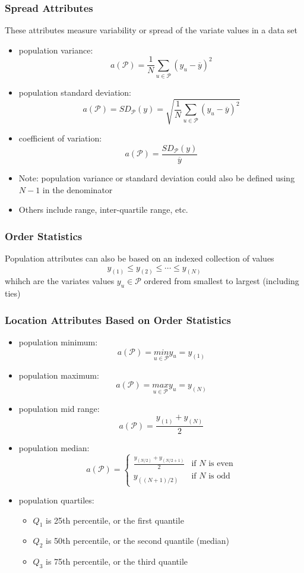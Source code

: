 \documentclass[11pt]{article}
\begin{document}
\subsubsection*{Spread Attributes}
These attributes measure variability or spread of the variate values in a data set
\begin{itemize}
    \item population variance: \[a(\mathcal{P})=\frac{1}{N}\sum_{u\in\mathcal{P}}(y_u-\overline{y})^2\]
    \item population standard deviation: \[a(\mathcal{P})=SD_\mathcal{P}(y)=\sqrt{\frac{1}{N}\sum_{u\in\mathcal{P}}(y_u-\overline{y})^2}\]
    \item coefficient of variation: \[a(\mathcal{P})=\dfrac{SD_\mathcal{P}(y)}{\overline{y}}\]    
    \item Note: population variance or standard deviation could also be defined using $N-1$ in the denominator
    \item Others include range, inter-quartile range, etc.
\end{itemize}
\subsubsection*{Order Statistics}
Population attributes can also be based on an indexed collection of values 
\[y_{(1)}\leq y_{(2)}\leq \cdots \leq y_{(N)}\]
whihch are the variates values $y_u\in\mathcal{P}$ ordered from smallest to largest (including ties)
\subsubsection*{Location Attributes Based on Order Statistics}
\begin{itemize}
    \item population minimum: \[a(\mathcal{P})=\underset{u\in\mathcal{P}}{min}y_u=y_{(1)}\]
    \item population maximum: \[a(\mathcal{P})=\underset{u\in\mathcal{P}}{max}y_u=y_{(N)}\]
    \item population mid range: \[a(\mathcal{P})=\frac{y_{(1)}+y_{(N)}}{2}\]
    \item population median: \[a(\mathcal{P})=\begin{cases}
        \frac{y_{(N/2)}+y_{(N/2+1)}}{2} & \text{if } N \text{ is even} \\
        y_{((N+1)/2)} & \text{if } N \text{ is odd}
    \end{cases}\]
    \item population quartiles:
    \begin{itemize}
        \item $Q_1$ is 25th percentile, or the first quantile 
        \item $Q_2$ is 50th percentile, or the second quantile (median)
        \item $Q_3$ is 75th percentile, or the third quantile
    \end{itemize}
\end{itemize}
\end{document}
